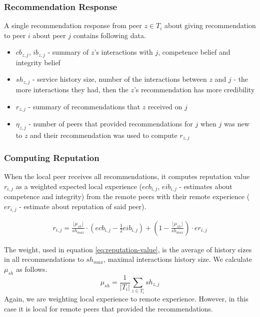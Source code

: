 \subsubsection{Recommendation Response}
A single recommendation response from peer $z \in T_{i}$ about giving recommendation to peer $i$ about peer $j$ contains following data.
\begin{itemize}
    \item $cb_{z,j}$, $ib_{z,j}$ - summary of $z$'s interactions with $j$, competence belief and integrity belief
    \item $sh_{z,j}$ - service history size, number of the interactions between $z$ and $j$ - the more interactions they had, then the $z$'s recommendation has more credibility
    \item $r_{z, j}$ - summary of recommendations that $z$ received on $j$
    \item $\eta_{z,j}$ - number of peers that provided recommendations for $j$ when $j$ was new to $z$ and their recommendation was used to compute $r_{z,j}$
\end{itemize}


\subsubsection{Computing Reputation}
\label{subsubsec:computing-reputation}
When the local peer receives all recommendations, it computes reputation value $r_{i,j}$ as a weighted expected local experience ($ecb_{i,j}$, $eib_{i,j}$ - estimates about competence and integrity) from the remote peers with their remote experience ($er_{i,j}$ - estimate about reputation of said peer).

\begin{equation}
\label{eq:reputation-value}
\begin{split}
    r_{i, j}=\frac{\lfloor\mu_{sh}\rfloor}{sh_{max}} \cdot \left(ecb_{i,j}-\frac{1}{2} eib_{i, j}\right) + \left(1-\frac{\lfloor\mu_{sh}\rfloor}{sh_{max}}\right) \cdot er_{i,j}
\end{split}
\end{equation}

\noindent
The weight, used in equation \ref{eq:reputation-value}, is the average of history sizes in all recommendations to $sh_{max}$, maximal interactions history size. 
We calculate $\mu_{sh}$ as follows.
\begin{equation}
    \mu_{sh} = \frac{1}{|T_{i}|} \sum_{z \in T_{i}} sh_{z, j}
\end{equation}
\noindent
Again, we are weighting local experience to remote experience. However, in this case it is local for remote peers that provided the recommendations.

